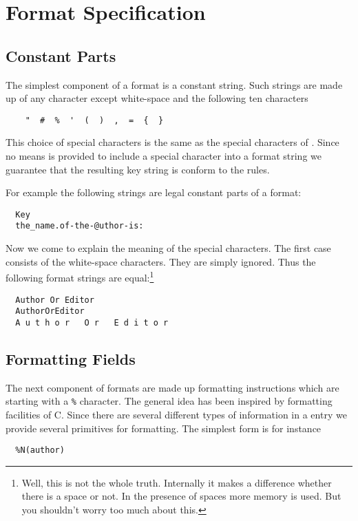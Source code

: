 \documentclass[11pt,a4paper]{scrbook}
\begin{document}
\section{Format Specification}\label{sec:key.format}

\subsection{Constant Parts}

The simplest component of a format is a constant string. Such strings are
made up of any character except white-space and the following ten characters

\begin{verbatim}
    "  #  %  '  (  )  ,  =  {  }
\end{verbatim}

This choice of special characters is the same as the special characters of
\BibTeX. Since no means is provided to include a special character into a
format string we guarantee that the resulting key string is conform to the
\BibTeX{} rules.

For example the following strings are legal constant
parts of a format:
\begin{verbatim}
  Key
  the_name.of-the-@uthor-is:
\end{verbatim}


Now we come to explain the meaning of the special characters. The first case
consists of the white-space characters. They are simply ignored. Thus the
following format strings are equal:\footnote{Well, this is not the whole
truth. Internally it makes a difference whether there is a space or not. In
the presence of spaces more memory is used. But you shouldn't worry too much
about this.}
\begin{verbatim}
  Author Or Editor
  AuthorOrEditor
  A u t h o r   O r   E d i t o r
\end{verbatim}


\subsection{Formatting Fields}\label{ssec:fields}

The next component of formats are made up formatting instructions which are
starting with a \texttt{\%} character. The general idea has been inspired by
formatting facilities of C. Since there are several different types of
information in a \BibTeX{} entry we provide several primitives for formatting.
The simplest form is for instance
\begin{verbatim}
  %N(author)
\end{verbatim}
\end{document}
